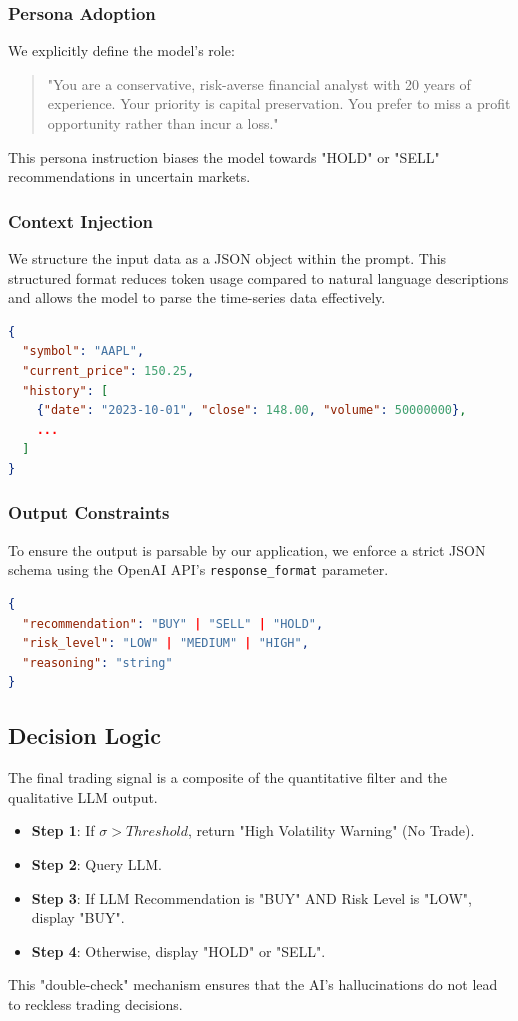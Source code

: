 \subsubsection{Persona Adoption}
We explicitly define the model's role:
\begin{quote}
    "You are a conservative, risk-averse financial analyst with 20 years of experience. Your priority is capital preservation. You prefer to miss a profit opportunity rather than incur a loss."
\end{quote}
This persona instruction biases the model towards "HOLD" or "SELL" recommendations in uncertain markets.

\subsubsection{Context Injection}
We structure the input data as a JSON object within the prompt. This structured format reduces token usage compared to natural language descriptions and allows the model to parse the time-series data effectively.
\begin{lstlisting}[language=json, caption=Data Context Structure]
{
  "symbol": "AAPL",
  "current_price": 150.25,
  "history": [
    {"date": "2023-10-01", "close": 148.00, "volume": 50000000},
    ...
  ]
}
\end{lstlisting}

\subsubsection{Output Constraints}
To ensure the output is parsable by our application, we enforce a strict JSON schema using the OpenAI API's \texttt{response\_format} parameter.
\begin{lstlisting}[language=json, caption=Target Output Schema]
{
  "recommendation": "BUY" | "SELL" | "HOLD",
  "risk_level": "LOW" | "MEDIUM" | "HIGH",
  "reasoning": "string"
}
\end{lstlisting}

\subsection{Decision Logic}
The final trading signal is a composite of the quantitative filter and the qualitative LLM output.
\begin{itemize}
    \item \textbf{Step 1}: If $\sigma > Threshold$, return "High Volatility Warning" (No Trade).
    \item \textbf{Step 2}: Query LLM.
    \item \textbf{Step 3}: If LLM Recommendation is "BUY" AND Risk Level is "LOW", display "BUY".
    \item \textbf{Step 4}: Otherwise, display "HOLD" or "SELL".
\end{itemize}
This "double-check" mechanism ensures that the AI's hallucinations do not lead to reckless trading decisions.
